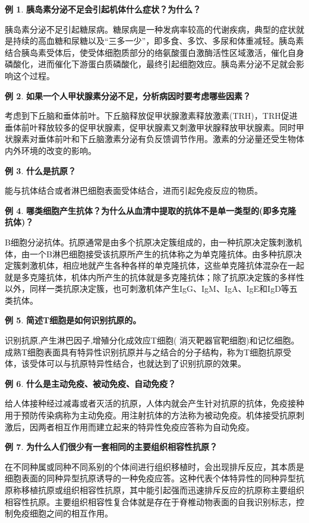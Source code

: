 \documentclass[UTF8]{article}
\theoremstyle{definition}
\newtheorem{example}{例}[section]
\begin{document}
\begin{example} \textbf{胰岛素分泌不足会引起机体什么症状？为什么？}

    胰岛素分泌不足引起糖尿病。糖尿病是一种发病率较高的代谢疾病，典型的症状就是持续的高血糖和尿糖以及“三多一少”，即多食、多饮、多尿和体重减轻。胰岛素结合胰岛素受体后，使受体细胞质部分的络氨酸蛋白激酶活性区域激活，催化自身磷酸化，进而催化下游蛋白质磷酸化，最终引起细胞效应。胰岛素分泌不足就会影响这个过程。
\end{example}
\begin{example} \textbf{如果一个人甲状腺素分泌不足，分析病因时要考虑哪些因素？}

    考虑到下丘脑和垂体前叶。下丘脑释放促甲状腺激素释放激素(TRH)，TRH促进垂体前叶释放较多的促甲状腺素，促甲状腺素又刺激甲状腺释放甲状腺素。同时甲状腺素对垂体前叶和下丘脑激素分泌有负反馈调节作用。激素的分泌量还受生物体内外环境的改变的影响。
\end{example}
\begin{example} \textbf{什么是抗原？}

    能与抗体结合或者淋巴细胞表面受体结合，进而引起免疫反应的物质。
\end{example}
\begin{example} \textbf{哪类细胞产生抗体？为什么从血清中提取的抗体不是单一类型的(即多克隆抗体)？}
    
    B细胞分泌抗体。抗原通常是由多个抗原决定簇组成的，由一种抗原决定簇刺激机体，由一个B淋巴细胞接受该抗原所产生的抗体称之为单克隆抗体。由多种抗原决定簇刺激机体，相应地就产生各种各样的单克隆抗体，这些单克隆抗体混杂在一起就是多克隆抗体，机体内所产生的抗体就是多克隆抗体；除了抗原决定簇的多样性以外，同样一类抗原决定簇，也可刺激机体产生IgG、IgM、IgA、IgE和IgD等五类抗体。
\end{example}
\begin{example} \textbf{简述T细胞是如何识别抗原的。}

    识别抗原,产生淋巴因子,增殖分化成效应T细胞( 消灭靶器官靶细胞)和记忆细胞。 成熟T细胞表面具有特异性识别抗原并与之结合的分子结构，称为T细胞抗原受体，该受体可以与抗原特异性结合，也就达到了识别抗原的效果。
\end{example}
\begin{example} \textbf{什么是主动免疫、被动免疫、自动免疫？}

    给人体接种经过减毒或者灭活的抗原，人体内就会产生针对抗原的抗体，免疫接种用于预防传染病称为主动免疫。用注射抗体的方法称为被动免疫。机体接受抗原刺激后，因两者相互作用而建立起来的特异性免疫应答称为自动免疫。
\end{example}
\begin{example} \textbf{为什么人们很少有一套相同的主要组织相容性抗原？}

    在不同种属或同种不同系别的个体间进行组织移植时，会出现排斥反应，其本质是细胞表面的同种异型抗原诱导的一种免疫应答。这种代表个体特异性的同种异型抗原称移植抗原或组织相容性抗原，其中能引起强而迅速排斥反应的抗原称主要组织相容性抗原。主要组织相容性复合体就是存在于脊椎动物表面的自我识别标志，控制免疫细胞之间的相互作用。
\end{example}
\end{document}
